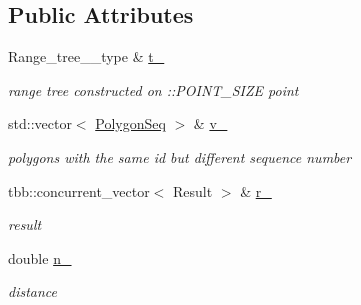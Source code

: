 \subsection*{Public Attributes}
\begin{DoxyCompactItemize}
\item 
\hypertarget{structSigSpatial2013_1_1within__n_a233b38ad524ac2e88ca3c7af8bbb6ee7}{Range\-\_\-tree\-\_\-\_\-type \& \hyperlink{structSigSpatial2013_1_1within__n_a233b38ad524ac2e88ca3c7af8bbb6ee7}{t\-\_\-}}\label{structSigSpatial2013_1_1within__n_a233b38ad524ac2e88ca3c7af8bbb6ee7}

\begin{DoxyCompactList}\small\item\em range tree constructed on \-::\-P\-O\-I\-N\-T\-\_\-\-S\-I\-Z\-E point \end{DoxyCompactList}\item 
\hypertarget{structSigSpatial2013_1_1within__n_a6f04a4fd6f5a228294cb213668ec4f6d}{std\-::vector$<$ \hyperlink{structSigSpatial2013_1_1PolygonSeq}{Polygon\-Seq} $>$ \& \hyperlink{structSigSpatial2013_1_1within__n_a6f04a4fd6f5a228294cb213668ec4f6d}{v\-\_\-}}\label{structSigSpatial2013_1_1within__n_a6f04a4fd6f5a228294cb213668ec4f6d}

\begin{DoxyCompactList}\small\item\em polygons with the same id but different sequence number \end{DoxyCompactList}\item 
\hypertarget{structSigSpatial2013_1_1within__n_a7f5003bec01e527b3e76291a98fe3919}{tbb\-::concurrent\-\_\-vector$<$ Result $>$ \& \hyperlink{structSigSpatial2013_1_1within__n_a7f5003bec01e527b3e76291a98fe3919}{r\-\_\-}}\label{structSigSpatial2013_1_1within__n_a7f5003bec01e527b3e76291a98fe3919}

\begin{DoxyCompactList}\small\item\em result \end{DoxyCompactList}\item 
\hypertarget{structSigSpatial2013_1_1within__n_aba7117da29bbd059bd15eebee8fdddb8}{double \hyperlink{structSigSpatial2013_1_1within__n_aba7117da29bbd059bd15eebee8fdddb8}{n\-\_\-}}\label{structSigSpatial2013_1_1within__n_aba7117da29bbd059bd15eebee8fdddb8}

\begin{DoxyCompactList}\small\item\em distance \end{DoxyCompactList}\end{DoxyCompactItemize}


